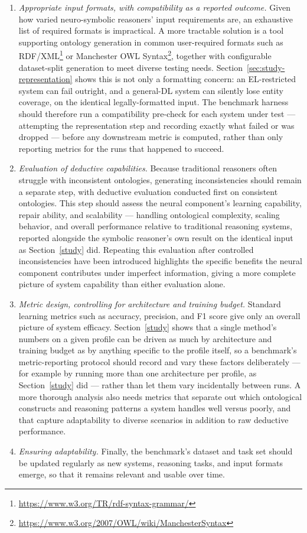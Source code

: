 \begin{enumerate}
\item \textit{Appropriate input formats, with compatibility as a reported outcome.} Given how varied neuro-symbolic reasoners' input requirements are, an exhaustive list of required formats is impractical. A more tractable solution is a tool supporting ontology generation in common user-required formats such as RDF/XML\footnote{\url{https://www.w3.org/TR/rdf-syntax-grammar/}} or Manchester OWL Syntax\footnote{\url{https://www.w3.org/2007/OWL/wiki/ManchesterSyntax}}, together with configurable dataset-split generation to meet diverse testing needs. Section~\ref{sec:study-representation} shows this is not only a formatting concern: an EL-restricted system can fail outright, and a general-DL system can silently lose entity coverage, on the identical legally-formatted input. The benchmark harness should therefore run a compatibility pre-check for each system under test — attempting the representation step and recording exactly what failed or was dropped — before any downstream metric is computed, rather than only reporting metrics for the runs that happened to succeed.

\item \textit{Evaluation of deductive capabilities.} Because traditional reasoners often struggle with inconsistent ontologies, generating inconsistencies should remain a separate step, with deductive evaluation conducted first on consistent ontologies. This step should assess the neural component's learning capability, repair ability, and scalability — handling ontological complexity, scaling behavior, and overall performance relative to traditional reasoning systems, reported alongside the symbolic reasoner's own result on the identical input as Section~\ref{study} did. Repeating this evaluation after controlled inconsistencies have been introduced highlights the specific benefits the neural component contributes under imperfect information, giving a more complete picture of system capability than either evaluation alone.

\item \textit{Metric design, controlling for architecture and training budget.} Standard learning metrics such as accuracy, precision, and F1 score give only an overall picture of system efficacy. Section~\ref{study} shows that a single method's numbers on a given profile can be driven as much by architecture and training budget as by anything specific to the profile itself, so a benchmark's metric-reporting protocol should record and vary these factors deliberately — for example by running more than one architecture per profile, as Section~\ref{study} did — rather than let them vary incidentally between runs. A more thorough analysis also needs metrics that separate out which ontological constructs and reasoning patterns a system handles well versus poorly, and that capture adaptability to diverse scenarios in addition to raw deductive performance.

\item \textit{Ensuring adaptability.} Finally, the benchmark's dataset and task set should be updated regularly as new systems, reasoning tasks, and input formats emerge, so that it remains relevant and usable over time.
\end{enumerate}

